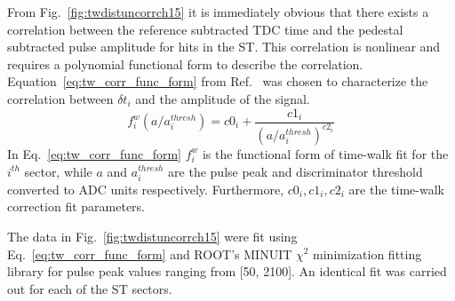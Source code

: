 From Fig.~\ref{fig:twdistuncorrch15} it is immediately obvious that there exists a correlation between the reference subtracted TDC time and the pedestal subtracted pulse amplitude for hits in the ST.  This correlation is nonlinear and requires a polynomial functional form to describe the correlation. Equation~\ref{eq:tw_corr_func_form} from Ref.~\cite{esmith_bcal} was chosen to characterize the correlation between $\delta t_{i}$ and the amplitude of the signal. 
	\begin{equation} \label{eq:tw_corr_func_form}
		f^{w}_{i}\left(a/a^{thresh}_{i}\right) = c0_{i} + \frac{c1_{i}}{(a/a^{thresh}_{i})^{c2_{i}}}
	\end{equation}
In Eq.~\ref{eq:tw_corr_func_form} $f^{w}_{i}$ is the functional form of time-walk fit for the $i^{th}$ sector, while $a$ and $a^{thresh}_{i}$ are the pulse peak and discriminator threshold converted to ADC units respectively.  Furthermore, $c0_{i}, c1_{i}, c2_{i}$ are the time-walk correction fit parameters.

The data in Fig.~\ref{fig:twdistuncorrch15} were fit using Eq.~\ref{eq:tw_corr_func_form} and ROOT's MINUIT $\chi^{2}$ minimization fitting library \cite{root_minuit} for pulse peak values ranging from [50, 2100].  An identical fit was carried out for each of the ST sectors.


